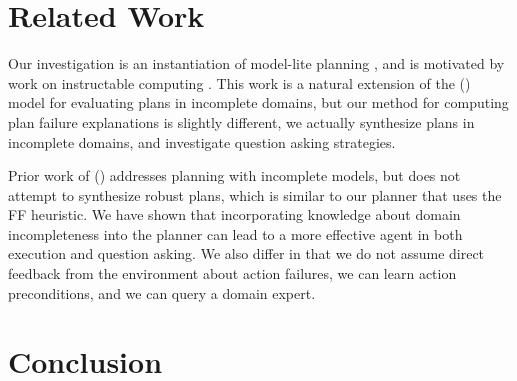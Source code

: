 \documentclass[letterpaper]{article}
\def\citep#1{\cite{#1}}
\def\citet#1{\citeauthor{#1} (\citeyear{#1})}
\def\FFRISKY{{\tt DeFAULT}}
\begin{document}
% 
% 
\section{Related Work}


Our investigation is an instantiation of model-lite planning \citep{modellite},
and is motivated by work on instructable computing \citep{mable}. This work is a
natural extension of the \citet{Garland02} model for evaluating plans in
incomplete domains, but our method for computing plan failure explanations
is slightly different, we actually synthesize plans in incomplete domains, and
investigate question asking strategies.

Prior work of \citet{DBLP:conf/aips/ChangA06} addresses planning with incomplete
models, but does not attempt to synthesize robust plans, which is similar to our
planner that uses the FF heuristic.  We have shown that incorporating knowledge
about domain incompleteness into the planner can lead to a more effective agent
in both execution and question asking. We also differ in that we do not assume
direct feedback from the environment about action failures, we can learn
action preconditions, and we can query a domain expert.


\section{Conclusion}
\end{document}
